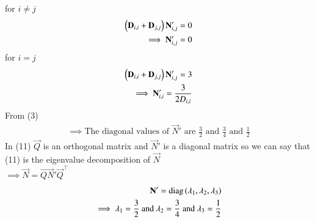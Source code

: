 \documentclass[journal]{IEEEtran}
\begin{document}
for $i\neq j$
\begin{align}
      \left(\mathbf{D}_{i,i} + \mathbf{D}_{j,j}\right)\mathbf{N}'_{i,j}=0\\
   \implies  \mathbf{N}'_{i,j}=0
\end{align}
for $i=j$
\begin{align}
     \left(\mathbf{D}_{i,i}+ \mathbf{D}_{j,j}\right)\mathbf{N}'_{i,j}=3\\
     \implies \mathbf{N}'_{i,i}=\frac{3}{2D_{i,i}}
\end{align}
From (3)
\begin{align}
    \implies \text{The diagonal values of } \vec{N}' \text{ are } \frac{3}{2} \text{ and } \frac{3}{4} \text{ and } \frac{1}{2}
\end{align}
In  (11) $\vec{Q}$ is an orthogonal matrix and $\vec{N}'$ is a diagonal matrix so we can say that (11) is the eigenvalue decomposition of $\vec{N}$\\
$\implies \vec{N}=\vec{QN}'\vec{Q}^\top$
\begin{align}
    \mathbf{N}'=\text{diag}\left(\lambda_1,\lambda_2 ,\lambda_3\right)\\
    \implies \lambda_1=\frac{3}{2} \text{ and } \lambda_2=\frac{3}{4} \text{ and } \lambda_3=\frac{1}{2}
\end{align}
\end{document}
